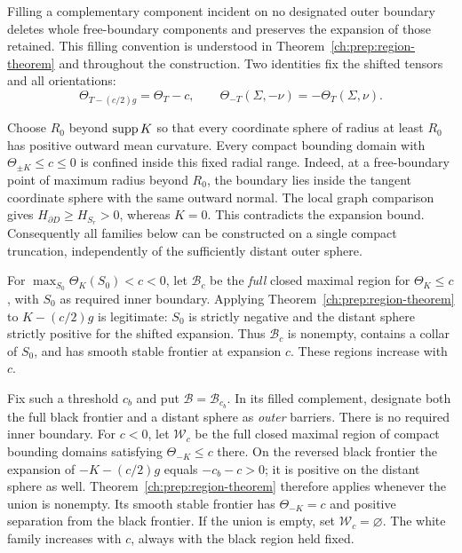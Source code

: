 Filling a complementary component incident on no designated outer
boundary deletes whole free-boundary components and preserves the
expansion of those retained.  This filling convention is understood
in Theorem~\ref{ch:prep:region-theorem} and throughout the construction.
Two identities fix the shifted tensors and all orientations:
\begin{equation}\label{ch:prep:shift-reversal}
 \Theta_{T-(c/2)g}=\Theta_T-c,
 \qquad \Theta_{-T}(\Sigma,-\nu)=-\Theta_T(\Sigma,\nu).
\end{equation}

Choose $R_0$ beyond $\operatorname{supp} K$ so that every coordinate sphere of
radius at least $R_0$ has positive outward mean curvature.  Every
compact bounding domain with $\Theta_{\pm K}\leq c\leq0$ is confined
inside this fixed radial range.  Indeed, at a free-boundary point
of maximum radius beyond $R_0$, the boundary lies inside the tangent
coordinate sphere with the same outward normal.  The local graph
comparison gives $H_{\partial D}\geq H_{S_r}>0$, whereas $K=0$.
This contradicts the expansion bound.  Consequently all families
below can be constructed on a single compact truncation, independently
of the sufficiently distant outer sphere.

For $\max_{S_0}\Theta_K(S_0)<c<0$, let $\mathcal B_c$ be the
\emph{full} closed maximal region for $\Theta_K\leq c$, with $S_0$
as required inner boundary.  Applying
Theorem~\ref{ch:prep:region-theorem} to $K-(c/2)g$ is legitimate:
$S_0$ is strictly negative and the distant sphere strictly positive
for the shifted expansion.  Thus $\mathcal B_c$ is nonempty, contains
a collar of $S_0$, and has smooth stable frontier at expansion $c$.
These regions increase with $c$.

Fix such a threshold $c_b$ and put $\mathcal B=\mathcal B_{c_b}$.
In its filled complement, designate both the full black frontier and a
distant sphere as \emph{outer} barriers.  There is no required inner
boundary.  For $c<0$, let $\mathcal W_c$ be the full closed maximal
region of compact bounding domains satisfying $\Theta_{-K}\leq c$
there.  On the reversed black frontier the expansion of
$-K-(c/2)g$ equals $-c_b-c>0$; it is positive on the distant
sphere as well.  Theorem~\ref{ch:prep:region-theorem} therefore applies
whenever the union is nonempty.  Its smooth stable frontier has
$\Theta_{-K}=c$ and positive separation from the black frontier.
If the union is empty, set $\mathcal W_c=\varnothing$.  The white
family increases with $c$, always with the black region held fixed.

